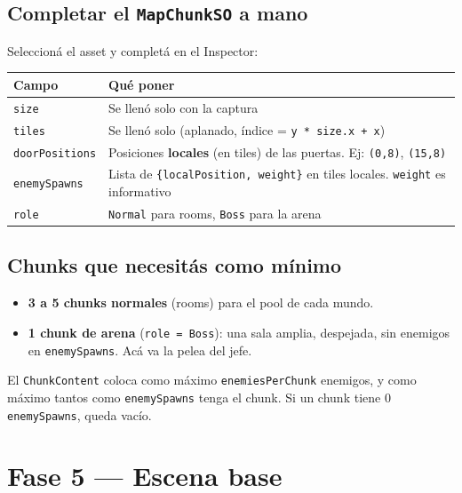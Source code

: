 \documentclass[a4paper,12pt]{article}
\newcommand{\code}[1]{\texttt{#1}}
\begin{document}
\subsection{Completar el \code{MapChunkSO} a mano}

Seleccioná el asset y completá en el Inspector:

\begin{center}
\begin{longtable}{|l|p{7.4cm}|}
\hline
\textbf{Campo} & \textbf{Qué poner} \\
\hline
\endhead
\code{size} & Se llenó solo con la captura \\
\hline
\code{tiles} & Se llenó solo (aplanado, índice = \code{y * size.x + x}) \\
\hline
\code{doorPositions} & Posiciones \textbf{locales} (en tiles) de las puertas. Ej: \code{(0,8)}, \code{(15,8)} \\
\hline
\code{enemySpawns} & Lista de \code{\{localPosition, weight\}} en tiles locales. \code{weight} es informativo \\
\hline
\code{role} & \code{Normal} para rooms, \code{Boss} para la arena \\
\hline
\end{longtable}
\end{center}

\subsection{Chunks que necesitás como mínimo}

\begin{itemize}
    \item \textbf{3 a 5 chunks normales} (rooms) para el pool de cada mundo.
    \item \textbf{1 chunk de arena} (\code{role = Boss}): una sala amplia, despejada, sin enemigos
    en \code{enemySpawns}. Acá va la pelea del jefe.
\end{itemize}

El \code{ChunkContent} coloca como máximo \code{enemiesPerChunk} enemigos, y como máximo tantos
como \code{enemySpawns} tenga el chunk. Si un chunk tiene 0 \code{enemySpawns}, queda vacío.

\section{Fase 5 --- Escena base}
\end{document}
